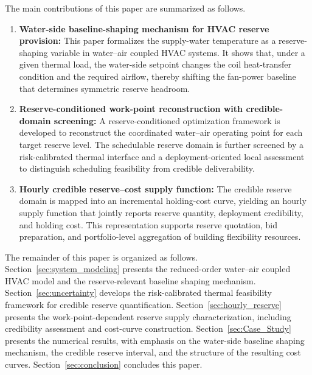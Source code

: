 \documentclass[journal]{IEEEtran}
\theoremstyle{remark}
\begin{document}
The main contributions of this paper are summarized as follows.
\begin{enumerate}
	\item \textbf{Water-side baseline-shaping mechanism for HVAC reserve provision:} 
	This paper formalizes the supply-water temperature as a reserve-shaping variable in water--air coupled HVAC systems. It shows that, under a given thermal load, the water-side setpoint changes the coil heat-transfer condition and the required airflow, thereby shifting the fan-power baseline that determines symmetric reserve headroom.
	
	\item \textbf{Reserve-conditioned work-point reconstruction with credible-domain screening:} 
	A reserve-conditioned optimization framework is developed to reconstruct the coordinated water--air operating point for each target reserve level. The schedulable reserve domain is further screened by a risk-calibrated thermal interface and a deployment-oriented local assessment to distinguish scheduling feasibility from credible deliverability.
	
	\item \textbf{Hourly credible reserve--cost supply function:} 
	The credible reserve domain is mapped into an incremental holding-cost curve, yielding an hourly supply function that jointly reports reserve quantity, deployment credibility, and holding cost. This representation supports reserve quotation, bid preparation, and portfolio-level aggregation of building flexibility resources.
\end{enumerate}

The remainder of this paper is organized as follows. Section~\ref{sec:system_modeling} presents the reduced-order water--air coupled HVAC model and the reserve-relevant baseline shaping mechanism. Section~\ref{sec:uncertainty} develops the risk-calibrated thermal feasibility framework for credible reserve quantification. Section~\ref{sec:hourly_reserve} presents the work-point-dependent reserve supply characterization, including credibility assessment and cost-curve construction. Section~\ref{sec:Case_Study} presents the numerical results, with emphasis on the water-side baseline shaping mechanism, the credible reserve interval, and the structure of the resulting cost curves. Section~\ref{sec:conclusion} concludes this paper.
\end{document}
